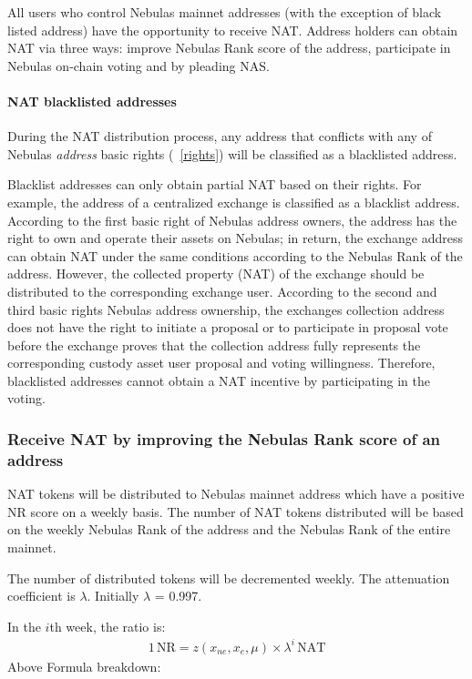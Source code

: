 All users who control Nebulas mainnet addresses (with the exception of black listed address) have the opportunity to receive NAT. Address holders can obtain NAT via three ways: improve Nebulas Rank score of the address, participate in Nebulas on-chain voting and by pleading NAS.


\paragraph{NAT blacklisted addresses}

During the NAT distribution process, any address that conflicts with any of
Nebulas \emph{address} basic rights (~\ref{rights}) will be classified as a blacklisted address.

Blacklist addresses can only obtain partial NAT based on their rights. For example, the address of a centralized exchange is classified as a blacklist address. According to the first basic right of Nebulas address owners, the address has the right to own and operate their assets on Nebulas; in return, the exchange address can obtain NAT under the same conditions according to the Nebulas Rank of the address. However, the collected property (NAT) of the exchange should be distributed to the corresponding exchange user. According to the second and third basic rights Nebulas address ownership, the exchanges collection address does not have the right to initiate a proposal or to participate in proposal vote before the exchange proves that the collection address fully represents the corresponding custody asset user proposal and voting willingness. Therefore, blacklisted addresses cannot obtain a NAT incentive by participating in the voting.


\subsubsection{Receive NAT by improving the Nebulas Rank score of an address}

NAT tokens will be distributed to Nebulas mainnet address which have a positive NR score on a weekly basis. The number of NAT tokens distributed will be based on the weekly Nebulas Rank of the address and the Nebulas Rank of the entire mainnet.

The number of distributed tokens will be decremented weekly. The attenuation coefficient is $\lambda$. Initially $\lambda$ = 0.997.

In the $i$th week, the ratio is:
\begin{align}
1\,\text{NR}=z(x_{ne},x_{e},\mu)\times\lambda^{i}\,\text{NAT}
\end{align}
Above Formula breakdown:

